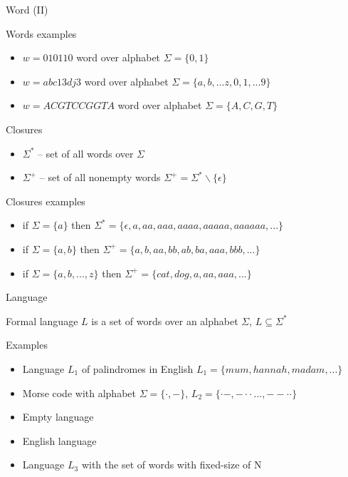 \documentclass{beamer}
\begin{document}
\begin{frame}{Word (II)}

\begin{exampleblock}{Words examples}
\begin{itemize}
\item $w = 010110$ word over alphabet $\Sigma = \{0, 1\}$
\item $w = abc13dj3$ word over alphabet $\Sigma = \{a, b, ...z, 0, 1, ...9\}$
\item $w = ACGTCCGGTA$ word over alphabet $\Sigma = \{A, C, G, T\}$
\end{itemize}
\end{exampleblock}

\begin{block}{Closures}
\begin{itemize}
\item $\Sigma^{\ast}$ -- set of all words over $\Sigma$
\item $\Sigma^{+}$ -- set of all nonempty words $\Sigma^+=\Sigma^*\backslash\{\epsilon\}$
\end{itemize}
\end{block}

\begin{exampleblock}{Closures examples}
\begin{itemize}
\item if $\Sigma = \{a\}$ then $\Sigma^{\ast} = \{\epsilon, a, aa, aaa, aaaa, aaaaa, aaaaaa, ...\}$
\item if $\Sigma = \{a, b\}$ then $\Sigma^{+} = \{a, b, aa, bb, ab, ba, aaa, bbb, ...\}$
\item if $\Sigma = \{a, b, ..., z\}$ then $\Sigma^{+} = \{cat, dog, a, aa, aaa, ...\}$
\end{itemize}
\end{exampleblock}

\end{frame}

\begin{frame}{Language}
	
\begin{definition}{Formal language}
$L$ is a set of words over an alphabet $\Sigma$, $L \subseteq \Sigma^{\ast}$
\end{definition}
	
\begin{exampleblock}{Examples}
\begin{itemize}
\item Language $L_1$ of palindromes in English $L_1 = \{mum, hannah, madam,...\}$
\item Morse code with alphabet $\Sigma=\{\cdot,	 -\}$, $L_2=\{\cdot -, - \cdot \cdot\,...,--\cdot\cdot\}$
\item Empty language
\item English language
\item Language $L_3$ with the set of words with fixed-size of N 
\end{itemize}
\end{exampleblock}
\end{frame}
\end{document}
